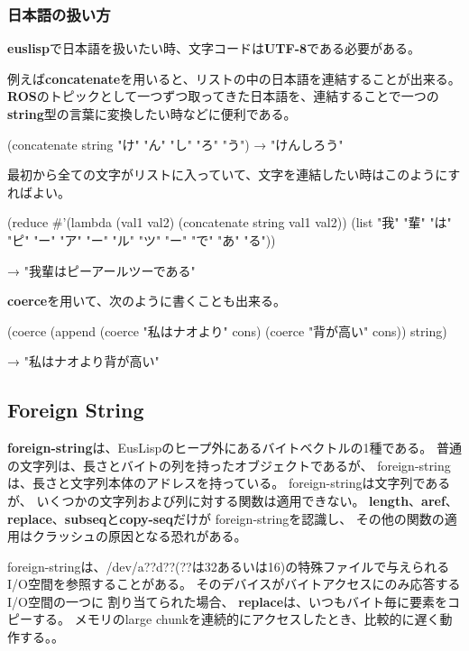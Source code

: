 \subsubsection{日本語の扱い方}
{\bf euslisp}で日本語を扱いたい時、文字コードは{\bf UTF-8}である必要がある。

例えば{\bf concatenate}を用いると、リストの中の日本語を連結することが出来る。
{\bf ROS}のトピックとして一つずつ取ってきた日本語を、連結することで一つの{\bf string}型の言葉に変換したい時などに便利である。

(concatenate string "け" "ん" "し" "ろ" "う") 
→ "けんしろう"

最初から全ての文字がリストに入っていて、文字を連結したい時はこのようにすればよい。

(reduce {\#}'(lambda (val1 val2) (concatenate string val1 val2)) (list "我" "輩" "は" "ピ" "ー" "ア" "ー" "ル" "ツ" "ー" "で" "あ" "る"))

→ "我輩はピーアールツーである"

{\bf coerce}を用いて、次のように書くことも出来る。

(coerce (append (coerce "私はナオより" cons) (coerce "背が高い" cons)) string)

→ "私はナオより背が高い"

\subsection{Foreign String}
{\bf foreign-string}は、EusLispのヒープ外にあるバイトベクトルの1種である。
普通の文字列は、長さとバイトの列を持ったオブジェクトであるが、
foreign-stringは、長さと文字列本体のアドレスを持っている。
foreign-stringは文字列であるが、
いくつかの文字列および列に対する関数は適用できない。
{\bf length}、{\bf aref}、{\bf replace}、{\bf subseq}と{\bf copy-seq}だけが
foreign-stringを認識し、 
その他の関数の適用はクラッシュの原因となる恐れがある。

foreign-stringは、/dev/a??d??(??は32あるいは16)の特殊ファイルで与えられる
I/O空間を参照することがある。
そのデバイスがバイトアクセスにのみ応答するI/O空間の一つに
割り当てられた場合、
{\bf replace}は、いつもバイト毎に要素をコピーする。
メモリのlarge chunkを連続的にアクセスしたとき、比較的に遅く動作する。。

\begin{refdesc}


\end{refdesc}
\newpage

